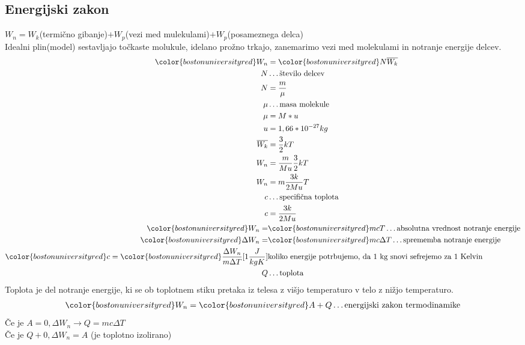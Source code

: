 {\color{indiagreen}\subsection{Energijski zakon}}
$W_n = W_k$(termično gibanje)$+ W_p$(vezi med mulekulami)$ + W_p$(posameznega delca)\\
Idealni plin(model) sestavljajo točkaste molukule, idelano prožno trkajo, zanemarimo vezi med molekulami in notranje energije delcev.\\
\begin{align*}
	{\color{bostonuniversityred}W_n} &= {\color{bostonuniversityred}N\overline{W_k}}\\
	N &\dots \text{število delcev}\\
	N &= \frac{m}{\mu}\\
	\mu &\dots \text{masa molekule}\\
	\mu &= M * u\\
	u &= 1,66 * 10^{-27}kg\\
	\overline{W_k} &= \frac{3}{2}kT\\
	W_n &= \frac{m}{Mu}\frac{3}{2}kT\\
	W_n &= m\frac{3k}{2Mu}T\\
	c &\dots\text{specifična toplota}\\
	c &= \frac{3k}{2Mu}\\
	{\color{bostonuniversityred}W_n} =& {\color{bostonuniversityred}mcT}\dots\text{absolutna vrednost notranje energije}\\
	{\color{bostonuniversityred}\Delta W_n} =& {\color{bostonuniversityred}mc\Delta T}\dots\text{sprememba notranje energije}\\
	{\color{bostonuniversityred}c} = {\color{bostonuniversityred}\frac{\Delta W_n}{m\Delta T}[1\frac{J}{kgK}]}&\text{koliko energije potrbujemo, da 1 kg snovi sefrejemo za 1 Kelvin}\\
	Q &\dots \text{toplota}
\end{align*}
Toplota je del notranje energije, ki se ob toplotnem stiku pretaka iz telesa z višjo temperaturo v telo z nižjo temperaturo.\\
\begin{align*}
	{\color{bostonuniversityred}W_n} &= {\color{bostonuniversityred}A + Q}\dots \text{energijski zakon termodinamike}\\
\end{align*}
Če je $A = 0, \Delta W_n \rightarrow Q = mc\Delta T$\\
Če je $Q + 0, \Delta W_n = A$ (je toplotno izolirano)\\